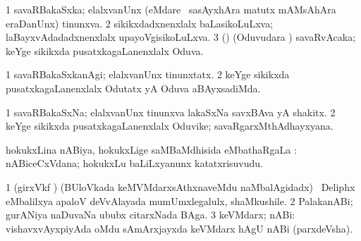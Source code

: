 \bentry
{}
\gl{\gu}
\bmng
\bnum
\num{1} savaRBakaSxka; elalxvanUnx (eMdare \kanmu\ sasAyxhAra matutx mAMsAhAra eraDanUnx) tinunxva. 
\num{2} sikikxdadxnenxlalx baLasikoLuLxva; laBayxvAdadadxnenxlalx upayoVgisikoLuLxva. 
\num{3} (\rUpa) (Oduvudara \vi) savaRvAcaka; keYge sikikxda pusatxkagaLanenxlalx Oduva. 
\enum
\emng
\eentry

\bentry
{}
\gl{\kirxvi}
\bmng
\bnum
\num{1} savaRBakaSxkanAgi; elalxvanUnx tinunxtatx. 
\num{2} keYge sikikxda pusatxkagaLanenxlalx Odutatx yA Oduva aBAyxsadiMda. 
\enum
\emng
\eentry

\bentry
{}
\gl{\nA}
\bmng
\bnum
\num{1} savaRBakaSxNa; elalxvanUnx tinunxva lakaSxNa savxBAva yA shakitx. 
\num{2} keYge sikikxda pusatxkagaLanenxlalx Oduvike; savaRgarxMthAdhayxyana. 
\enum
\emng
\eentry

\bentry
{}
\gl{\sapUpa}
\bmng
hokukxLina nABiya, hokukxLige saMBaMdhisida eMbathaRgaLa \sapUpa:  nABiceCxVdana; hokukxLu baLiLxyanunx katatxrisuvudu. 
\emng
\eentry

\bentry
{}
\gl{\nA}
\bmng
\bnum
\num{1} (girxVkf \pArxca) (BUloVkada keMVMdarxsAthxnaveMdu naMbalAgidadx) \kanmu\ Deliphx eMbalilxya apaloV deVvAlayada mumUmxlegalulx, shaMkushile. 
\num{2} PalakanABi; gurANiya naDuvaNa ububx citarxNada BAga. 
\num{3} keVMdarx; nABi:  vishavxvAyxpiyAda oMdu sAmArxjayxda keVMdarx hAgU nABi (parxdeVsha). 
\enum
\emng
\eentry

